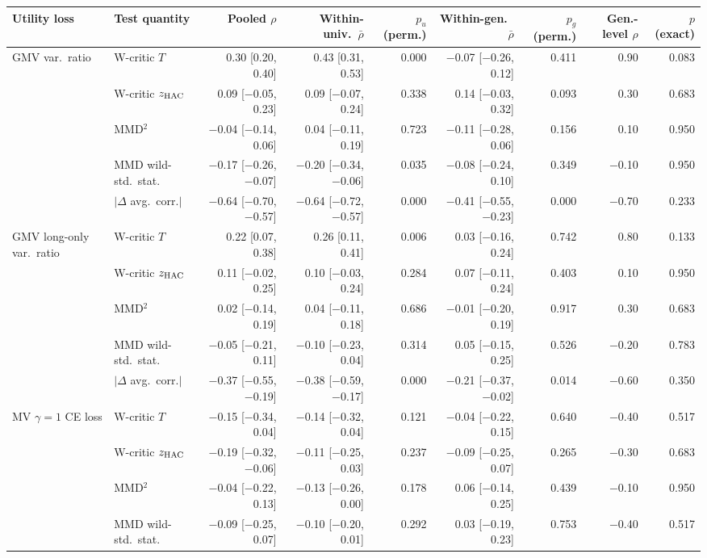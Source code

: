 \begin{tabular}{llrrrrrrr}
\toprule
Utility loss & Test quantity & Pooled $\rho$ & Within-univ.\ $\bar\rho$ & $p_u$ (perm.) & Within-gen.\ $\bar\rho$ & $p_g$ (perm.) & Gen.-level $\rho$ & $p$ (exact) \\
\midrule
GMV var.\ ratio & W-critic $T$ & 0.30 [0.20, 0.40] & 0.43 [0.31, 0.53] & 0.000 & $-$0.07 [$-$0.26, 0.12] & 0.411 & 0.90 & 0.083 \\
 & W-critic $z_{\rm HAC}$ & 0.09 [$-$0.05, 0.23] & 0.09 [$-$0.07, 0.24] & 0.338 & 0.14 [$-$0.03, 0.32] & 0.093 & 0.30 & 0.683 \\
 & MMD$^2$ & $-$0.04 [$-$0.14, 0.06] & 0.04 [$-$0.11, 0.19] & 0.723 & $-$0.11 [$-$0.28, 0.06] & 0.156 & 0.10 & 0.950 \\
 & MMD wild-std.\ stat. & $-$0.17 [$-$0.26, $-$0.07] & $-$0.20 [$-$0.34, $-$0.06] & 0.035 & $-$0.08 [$-$0.24, 0.10] & 0.349 & $-$0.10 & 0.950 \\
 & $|\Delta$ avg.\ corr.$|$ & $-$0.64 [$-$0.70, $-$0.57] & $-$0.64 [$-$0.72, $-$0.57] & 0.000 & $-$0.41 [$-$0.55, $-$0.23] & 0.000 & $-$0.70 & 0.233 \\
GMV long-only var.\ ratio & W-critic $T$ & 0.22 [0.07, 0.38] & 0.26 [0.11, 0.41] & 0.006 & 0.03 [$-$0.16, 0.24] & 0.742 & 0.80 & 0.133 \\
 & W-critic $z_{\rm HAC}$ & 0.11 [$-$0.02, 0.25] & 0.10 [$-$0.03, 0.24] & 0.284 & 0.07 [$-$0.11, 0.24] & 0.403 & 0.10 & 0.950 \\
 & MMD$^2$ & 0.02 [$-$0.14, 0.19] & 0.04 [$-$0.11, 0.18] & 0.686 & $-$0.01 [$-$0.20, 0.19] & 0.917 & 0.30 & 0.683 \\
 & MMD wild-std.\ stat. & $-$0.05 [$-$0.21, 0.11] & $-$0.10 [$-$0.23, 0.04] & 0.314 & 0.05 [$-$0.15, 0.25] & 0.526 & $-$0.20 & 0.783 \\
 & $|\Delta$ avg.\ corr.$|$ & $-$0.37 [$-$0.55, $-$0.19] & $-$0.38 [$-$0.59, $-$0.17] & 0.000 & $-$0.21 [$-$0.37, $-$0.02] & 0.014 & $-$0.60 & 0.350 \\
MV $\gamma=1$ CE loss & W-critic $T$ & $-$0.15 [$-$0.34, 0.04] & $-$0.14 [$-$0.32, 0.04] & 0.121 & $-$0.04 [$-$0.22, 0.15] & 0.640 & $-$0.40 & 0.517 \\
 & W-critic $z_{\rm HAC}$ & $-$0.19 [$-$0.32, $-$0.06] & $-$0.11 [$-$0.25, 0.03] & 0.237 & $-$0.09 [$-$0.25, 0.07] & 0.265 & $-$0.30 & 0.683 \\
 & MMD$^2$ & $-$0.04 [$-$0.22, 0.13] & $-$0.13 [$-$0.26, 0.00] & 0.178 & 0.06 [$-$0.14, 0.25] & 0.439 & $-$0.10 & 0.950 \\
 & MMD wild-std.\ stat. & $-$0.09 [$-$0.25, 0.07] & $-$0.10 [$-$0.20, 0.01] & 0.292 & 0.03 [$-$0.19, 0.23] & 0.753 & $-$0.40 & 0.517 \\

\end{tabular}
